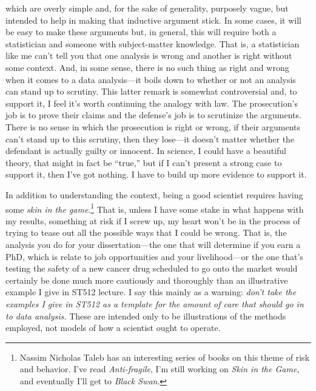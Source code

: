 \documentclass[a4paper, 12pt]{article}
\theoremstyle{plain}
\theoremstyle{definition}
\theoremstyle{remark}
\begin{document}
which are overly simple and, for the sake of generality, purposely vague, but intended to help in making that inductive argument stick.  In some cases, it will be easy to make these arguments but, in general, this will require both a statistician and someone with subject-matter knowledge.  That is, a statistician like me can't tell you that one analysis is wrong and another is right without some context.  And, in some sense, there is no such thing as right and wrong when it comes to a data analysis---it boils down to whether or not an analysis can stand up to scrutiny.  This latter remark is somewhat controversial and, to support it, I feel it's worth continuing the analogy with law.  The prosecution's job is to prove their claims and the defense's job is to scrutinize the arguments.  There is no sense in which the prosecution is right or wrong, if their arguments can't stand up to this scrutiny, then they lose---it doesn't matter whether the defendant is actually guilty or innocent.  In science, I could have a beautiful theory, that might in fact be ``true,'' but if I can't present a strong case to support it, then I've got nothing.  I have to build up more evidence to support it. 

In addition to understanding the context, being a good scientist requires having some {\em skin in the game}.\footnote{Nassim Nicholas Taleb has an interesting series of books on this theme of risk and behavior.  I've read {\em Anti-fragile}, I'm still working on {\em Skin in the Game}, and eventually I'll get to {\em Black Swan}.}  That is, unless I have some stake in what happens with my results, something at risk if I screw up, my heart won't be in the process of trying to tease out all the possible ways that I could be wrong.  That is, the analysis you do for your dissertation---the one that will determine if you earn a PhD, which is relate to job opportunities and your livelihood---or the one that's testing the safety of a new cancer drug scheduled to go onto the market would certainly be done much more cautiously and thoroughly than an illustrative example I give in ST512 lecture.  I say this mainly as a warning: {\em don't take the examples I give in ST512 as a template for the amount of care that should go in to data analysis.}  These are intended only to be illustrations of the methods employed, not models of how a scientist ought to operate.  
\end{document}
